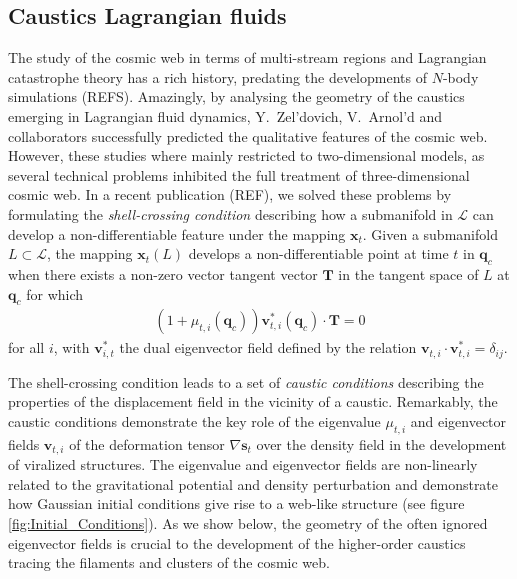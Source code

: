 \documentclass[a4paper, 11pt]{article}
\begin{document}
\subsection{Caustics Lagrangian fluids}
The study of the cosmic web in terms of multi-stream regions and Lagrangian catastrophe theory has a rich history, predating the developments of $N$-body simulations (REFS). Amazingly, by analysing the geometry of the caustics emerging in Lagrangian fluid dynamics, Y.\ Zel'dovich, V.\ Arnol'd and collaborators successfully predicted the qualitative features of the cosmic web. However, these studies where mainly restricted to two-dimensional models, as several technical problems inhibited the full treatment of three-dimensional cosmic web. In a recent publication (REF), we solved these problems by formulating the \textit{shell-crossing condition} describing how a submanifold in $\mathcal{L}$ can develop a non-differentiable feature under the mapping $\bm{x}_t$. Given a submanifold $L \subset \mathcal{L}$, the mapping $\bm{x}_t(L)$ develops a non-differentiable point at time $t$ in $\bm{q}_c$ when there exists a non-zero vector tangent vector $\bm{T}$ in the tangent space of $L$ at $\bm{q}_c$ for which 
\begin{align}
(1+\mu_{t,i}(\bm{q}_c))\bm{v}_{t,i}^*(\bm{q}_c) \cdot \bm{T}=0
\label{eq:shellCrossingCondition}
\end{align}
for all $i$, with $\bm{v}_{i,t}^*$ the dual eigenvector field defined by the relation $\bm{v}_{t,i}\cdot \bm{v}_{t,i}^* = \delta_{ij}$.

The shell-crossing condition leads to a set of \textit{caustic conditions} describing the properties of the displacement field in the vicinity of a caustic. Remarkably, the caustic conditions demonstrate the key role of the eigenvalue $\mu_{t,i}$ and eigenvector fields $\bm{v}_{t,i}$ of the deformation tensor $\nabla \bm{s}_t$ over the density field in the development of viralized structures. The eigenvalue and eigenvector fields are non-linearly related to the gravitational potential and density perturbation and demonstrate how Gaussian initial conditions give rise to a web-like structure (see figure \ref{fig:Initial_Conditions}). As we show below, the geometry of the often ignored eigenvector fields is crucial to the development of the higher-order caustics tracing the filaments and clusters of the cosmic web.
\end{document}
